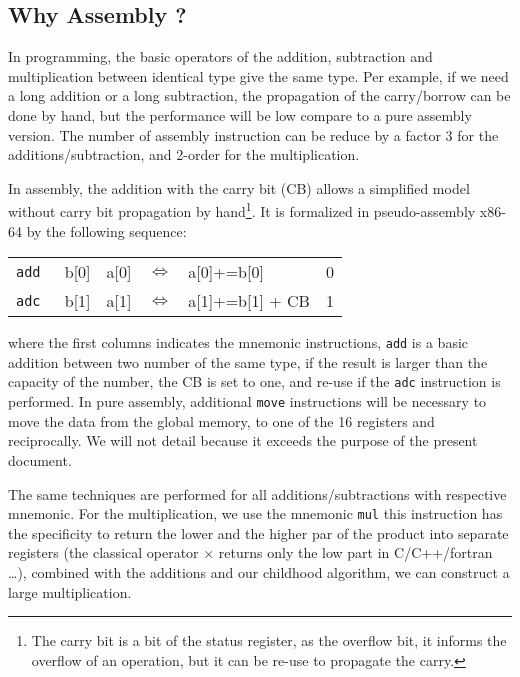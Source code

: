 \documentclass[11pt]{amsart}
\begin{document}
\subsection*{Why Assembly ?}

In programming, the basic operators of the addition, subtraction and multiplication between identical type give the same type. 
Per example, if we need a long addition or a long subtraction, the propagation of the  carry/borrow can be done by hand, but the performance will be low compare to a pure assembly version. 
The number of assembly instruction can be reduce by a factor 3 for the additions/subtraction, and  2-order for the multiplication.

In assembly, the addition with the carry bit (CB) allows a simplified model without  carry bit propagation by hand\footnote{ The carry bit is a bit of the status register, as the overflow bit, 
it informs  the overflow of an operation, but it can be re-use to propagate the carry. }.  It is formalized in pseudo-assembly x86-64 by the following sequence:
\begin{table}[htdp]
\begin{center}
\begin{tabular}{ l c c c l c}
 \texttt{add }   &  b[0]  & a[0]    & $\Leftrightarrow$ & a[0]+=b[0]            & \tiny{0}  \\ 
 \texttt{adc }   &  b[1]   & a[1]   & $\Leftrightarrow$ & a[1]+=b[1] + CB  & \tiny{1}  \\  
\end{tabular}
\end{center}
\end{table}%
where the first columns indicates the  mnemonic instructions, \texttt{add} is a basic addition between two number of the same type, if the result is larger than the capacity of the number, the CB is set to one,
and re-use if the \texttt{adc} instruction is performed. In pure assembly, additional \texttt{move} instructions will be necessary to move the data from the global memory, to one of the 16 registers and reciprocally.
We will not detail because it exceeds the purpose of the present document. 

The same techniques are performed for all additions/subtractions with respective mnemonic. For the multiplication, we use the mnemonic \texttt{mul} this instruction has the specificity to return the lower and the higher
par of the product into  separate registers (the classical operator $\times$ returns only the low part in C/C++/fortran \dots), combined with the additions and our childhood algorithm, we can construct a large multiplication.  
\end{document}
